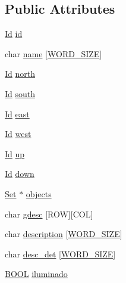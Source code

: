 \subsection*{Public Attributes}
\begin{DoxyCompactItemize}
\item 
\hyperlink{types_8h_a845e604fb28f7e3d97549da3448149d3}{Id} \hyperlink{struct__Space_a70cb461deb9ac073e401b607339b567f}{id}
\item 
char \hyperlink{struct__Space_a4e8775f2ba9ae19392f9942dbb5f5ec0}{name} \mbox{[}\hyperlink{types_8h_a92ed8507d1cd2331ad09275c5c4c1c89}{W\+O\+R\+D\+\_\+\+S\+I\+Z\+E}\mbox{]}
\item 
\hyperlink{types_8h_a845e604fb28f7e3d97549da3448149d3}{Id} \hyperlink{struct__Space_ae5ebe53ce79514d7d2d93911e0159252}{north}
\item 
\hyperlink{types_8h_a845e604fb28f7e3d97549da3448149d3}{Id} \hyperlink{struct__Space_a646b68c22a0bbf1685033c96109d31d1}{south}
\item 
\hyperlink{types_8h_a845e604fb28f7e3d97549da3448149d3}{Id} \hyperlink{struct__Space_a41ce2bf33cf0c157b358221f094ee05b}{east}
\item 
\hyperlink{types_8h_a845e604fb28f7e3d97549da3448149d3}{Id} \hyperlink{struct__Space_a20c1d259e93b44e24ba82982e142eb9b}{west}
\item 
\hyperlink{types_8h_a845e604fb28f7e3d97549da3448149d3}{Id} \hyperlink{struct__Space_af2a50145d93dfb8d82b8b42138dc57a1}{up}
\item 
\hyperlink{types_8h_a845e604fb28f7e3d97549da3448149d3}{Id} \hyperlink{struct__Space_ac20194f418676bb03cca7e0fdcb6f559}{down}
\item 
\hyperlink{set_8h_a6d3b7f7c92cbb4577ef3ef7ddbf93161}{Set} $\ast$ \hyperlink{struct__Space_a661ed8b0fc8085b6db70188aa5085625}{objects}
\item 
char \hyperlink{struct__Space_a2e0e2822b0391261395af37c2d12b4bf}{gdesc} \mbox{[}R\+O\+W\mbox{]}\mbox{[}C\+O\+L\mbox{]}
\item 
char \hyperlink{struct__Space_a2a50aacb78d1d0f65f5b14f94ed81d80}{description} \mbox{[}\hyperlink{types_8h_a92ed8507d1cd2331ad09275c5c4c1c89}{W\+O\+R\+D\+\_\+\+S\+I\+Z\+E}\mbox{]}
\item 
char \hyperlink{struct__Space_aa45e63028e88eb1bbd881c30b9478797}{desc\+\_\+det} \mbox{[}\hyperlink{types_8h_a92ed8507d1cd2331ad09275c5c4c1c89}{W\+O\+R\+D\+\_\+\+S\+I\+Z\+E}\mbox{]}
\item 
\hyperlink{types_8h_a3e5b8192e7d9ffaf3542f1210aec18dd}{B\+O\+O\+L} \hyperlink{struct__Space_a94562449709befaa54497c15b6256efc}{iluminado}
\end{DoxyCompactItemize}


